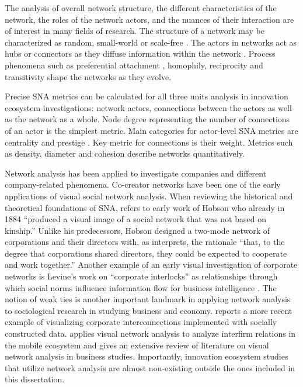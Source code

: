 The analysis of overall network structure, the different characteristics of the network, the roles of the network actors, and the nuances of their interaction are of interest in many fields of research. The structure of a network may be characterized as random, small-world \citep{Watts1998, Milgram1967TheProblem} or scale-free \citep{Barabasi2003}. The actors in networks act as hubs or connectors as they diffuse information within the network \citep[cf.][]{Molka-Danielsen2007IRISAnalysis}. Process phenomena such as preferential attachment \citep{Barabasi1999EmergenceNetworks}, homophily, reciprocity and transitivity \citep[cf.][]{Giuliani2008} shape the networks as they evolve.

Precise SNA metrics can be calculated for all three units analysis in innovation ecosystem investigations: network actors, connections between the actors as well as the network as a whole. Node degree representing the number of connections of an actor is the simplest metric. Main categories for actor-level SNA metrics are centrality and prestige \citep{Wasserman1994SocialApplications}. Key metric for connections is their weight. Metrics such as density, diameter and cohesion \citep{Hansen2011AnalyzingWorld} describe networks quantitatively.

Network analysis has been applied to investigate companies and different company-related phenomena. Co-creator networks have been one of the early applications of visual social network analysis. When reviewing the historical and theoretical foundations of SNA, \cite{Freeman2009MethodsVisualization} refers to early work of Hobson who already in 1884 ``produced a visual image of a social network that was not based on kinship.'' Unlike his predecessors, Hobson designed a two-mode network of corporations and their directors with, as \cite{Freeman2009MethodsVisualization} interprets, the rationale ``that, to the degree that corporations shared directors, they could be expected to cooperate and work together.'' Another example of an early visual investigation of corporate networks is Levine's work on ``corporate interlocks'' as relationships through which social norms influence information flow for business intelligence \citep{Levine1979Joint-spaceAlternatives}. The notion of weak ties \citep{Granovetter1973TheTies} is another important landmark in applying network analysis to sociological research in studying business and economy. \cite{Olson2008GreatAPI} reports a more recent example of visualizing corporate interconnections implemented with socially constructed data. \cite{Basole2009VisualizationEcosystem} applies visual network analysis to analyze interfirm relations in the mobile ecosystem and gives an extensive review of literature on visual network analysis in business studies. Importantly, innovation ecosystem studies that utilize network analysis are almost non-existing outside the ones included in this dissertation.


